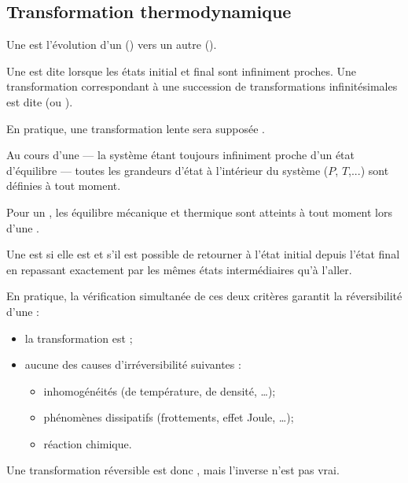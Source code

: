 \subsection{Transformation thermodynamique}

\begin{definition}
Une  est l'évolution d'un  () vers un autre ().
\end{definition}

\begin{definition}
Une  est dite  lorsque les états initial et final sont infiniment proches. Une transformation correspondant à une succession de transformations infinitésimales est dite  (ou ).
\end{definition}

\begin{remarque}
En pratique, une transformation lente sera supposée .
\end{remarque}

\begin{propriete}
Au cours d'une  --- la système étant toujours infiniment proche d'un état d'équilibre --- toutes les grandeurs d'état à l'intérieur du système ($P$, $T$,...) sont définies à tout moment.
\end{propriete}

\begin{remarque}
Pour un , les équilibre mécanique et thermique sont atteints à tout moment lors d'une .
\end{remarque}

\begin{definition}
Une  est  si elle est  et s'il est possible de retourner à l'état initial depuis l'état final en repassant exactement par les mêmes états intermédiaires qu'à l'aller.
\end{definition}

\begin{remarque}
En pratique, la vérification simultanée de ces deux critères garantit la réversibilité d'une  :

\begin{itemize}
\item la transformation est ;
\item aucune des causes d'irréversibilité suivantes :
\begin{itemize}
\item inhomogénéités (de température, de densité, \ldots);
\item phénomènes dissipatifs (frottements, effet Joule, \ldots);
\item réaction chimique.
\end{itemize}
\end{itemize}

\noindent Une transformation réversible est donc , mais l'inverse n'est pas vrai.
\end{remarque}

